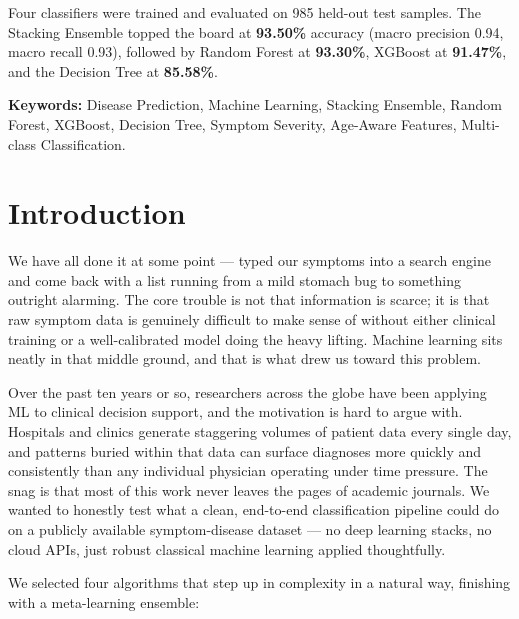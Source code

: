 \documentclass[12pt,a4paper]{article}
\begin{document}
Four classifiers were trained and evaluated on 985 held-out test samples. The Stacking Ensemble topped the board at \textbf{93.50\%} accuracy (macro precision 0.94, macro recall 0.93), followed by Random Forest at \textbf{93.30\%}, XGBoost at \textbf{91.47\%}, and the Decision Tree at \textbf{85.58\%}.

\textbf{Keywords:} Disease Prediction, Machine Learning, Stacking Ensemble, Random Forest, XGBoost, Decision Tree, Symptom Severity, Age-Aware Features, Multi-class Classification.

\section{Introduction}

We have all done it at some point --- typed our symptoms into a search engine and come back with a list running from a mild stomach bug to something outright alarming. The core trouble is not that information is scarce; it is that raw symptom data is genuinely difficult to make sense of without either clinical training or a well-calibrated model doing the heavy lifting. Machine learning sits neatly in that middle ground, and that is what drew us toward this problem.

Over the past ten years or so, researchers across the globe have been applying ML to clinical decision support, and the motivation is hard to argue with. Hospitals and clinics generate staggering volumes of patient data every single day, and patterns buried within that data can surface diagnoses more quickly and consistently than any individual physician operating under time pressure. The snag is that most of this work never leaves the pages of academic journals. We wanted to honestly test what a clean, end-to-end classification pipeline could do on a publicly available symptom-disease dataset --- no deep learning stacks, no cloud APIs, just robust classical machine learning applied thoughtfully.

We selected four algorithms that step up in complexity in a natural way, finishing with a meta-learning ensemble:
\end{document}

